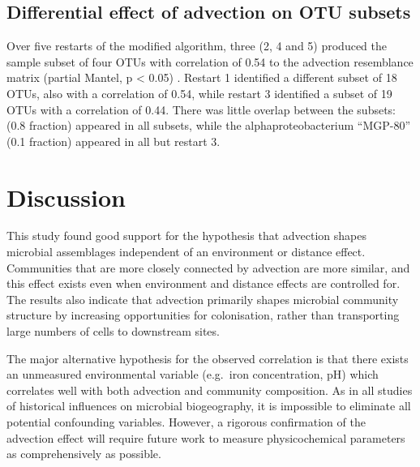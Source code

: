 \subsection{Differential effect of advection on OTU subsets}

Over five restarts of the modified  algorithm, three (2, 4 and 5) produced the sample subset of four \acp{OTU} with correlation of 0.54 to the advection resemblance matrix (partial Mantel, p < 0.05) .
Restart 1 identified a different subset of 18 \acp{OTU}, also with a correlation of 0.54, while restart 3 identified a subset of 19 \acp{OTU} with a correlation of 0.44.
There was little overlap between the subsets:  (0.8 \micron{} fraction) appeared in all subsets, while the alphaproteobacterium ``MGP-80'' (0.1 \micron{} fraction) appeared in all but restart 3.



\section{Discussion}

This study found good support for the hypothesis that advection shapes microbial assemblages independent of an environment or distance effect.
Communities that are more closely connected by advection are more similar, and this effect exists even when environment and distance effects are controlled for.
The results also indicate that advection primarily shapes microbial community structure by increasing opportunities for colonisation, rather than transporting large numbers of cells to downstream sites. 

The major alternative hypothesis for the observed correlation is that there exists an unmeasured environmental variable (e.g.\ iron concentration, pH) which correlates well with both advection and community composition.
As in all studies of historical influences on microbial biogeography, it is impossible to eliminate all potential confounding variables.
However, a rigorous confirmation of the advection effect will require future work to measure physicochemical parameters as comprehensively as possible.

